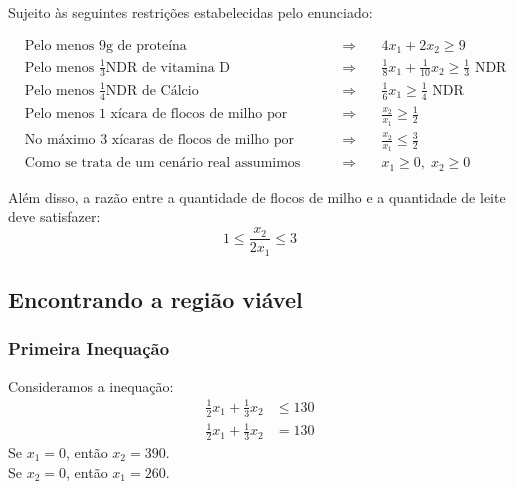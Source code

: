\documentclass{article}
\begin{document}
Sujeito às seguintes restrições estabelecidas pelo enunciado:


\begin{align*}
    &\text{Pelo menos 9g de proteína} 
    &\quad \Longrightarrow \quad&
    4x_1 + 2x_2 \geq 9 \\
    &\text{Pelo menos $\frac{1}{3}$NDR de vitamina D} 
    &\quad \Longrightarrow \quad&
    \frac{1}{8}x_1 + \frac{1}{10}x_2 \geq \frac{1}{3} \text{ NDR} \\
    &\text{Pelo menos $\frac{1}{4}$NDR de Cálcio} 
    &\quad \Longrightarrow \quad&
    \frac{1}{6}x_1 \geq \frac{1}{4} \text{ NDR} \\
    &\text{Pelo menos 1 xícara de flocos de milho por copo (dois meios copos) de leite} 
    &\quad \Longrightarrow \quad&
    \frac{x_2}{x_1} \geq \frac{1}{2} \\
    &\text{No máximo 3 xícaras de flocos de milho por copo (dois meios copos) de leite} 
    &\quad \Longrightarrow \quad&
    \frac{x_2}{x_1} \leq \frac{3}{2} \\
    &\text{Como se trata de um cenário real assumimos valores positivos} 
    &\quad \Longrightarrow \quad&
    x_1 \geq 0, \; x_2 \geq 0
\end{align*}

Além disso, a razão entre a quantidade de flocos de milho e a quantidade de leite deve satisfazer:
\begin{equation}
    1 \leq \frac{x_2}{2x_1} \leq 3
\end{equation}


\subsection{Encontrando a região viável}

\begin{tcolorbox}[colback=yellow!10, colframe=red!50!black, title=Importante!]
\end{tcolorbox}

\subsubsection{Primeira Inequação}

Consideramos a inequação:
\begin{align}
    \frac{1}{2}x_1 + \frac{1}{3}x_2 &\leq 130 \\
    \frac{1}{2}x_1 + \frac{1}{3}x_2 &= 130
\end{align}
Se $x_1 = 0$, então $x_2 = 390$. \\
Se $x_2 = 0$, então $x_1 = 260$.
\end{document}
